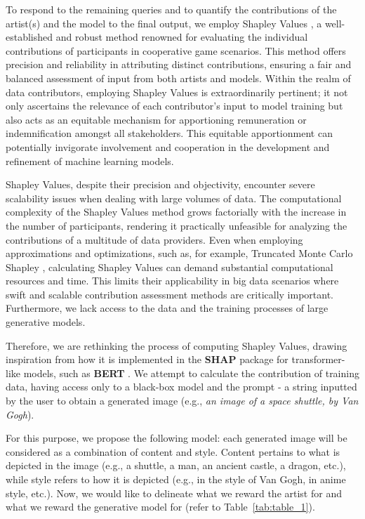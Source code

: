 \documentclass[12pt, letterpaper]{article}
\begin{document}
To respond to the remaining queries and to quantify the contributions of the artist(s) and the model to the final output, we employ Shapley Values \cite{shapley1953value}, a well-established and robust method renowned for evaluating the individual contributions of participants in cooperative game scenarios. This method offers precision and reliability in attributing distinct contributions, ensuring a fair and balanced assessment of input from both artists and models. Within the realm of data contributors, employing Shapley Values is extraordinarily pertinent; it not only ascertains the relevance of each contributor’s input to model training but also acts as an equitable mechanism for apportioning remuneration or indemnification amongst all stakeholders. This equitable apportionment can potentially invigorate involvement and cooperation in the development and refinement of machine learning models.

Shapley Values, despite their precision and objectivity, encounter severe scalability issues when dealing with large volumes of data. The computational complexity of the Shapley Values method grows factorially with the increase in the number of participants, rendering it practically unfeasible for analyzing the contributions of a multitude of data providers. Even when employing approximations and optimizations, such as, for example, Truncated Monte Carlo Shapley \cite{ghorbani2019data}, calculating Shapley Values can demand substantial computational resources and time. This limits their applicability in big data scenarios where swift and scalable contribution assessment methods are critically important. Furthermore, we lack access to the data and the training processes of large generative models.

Therefore, we are rethinking the process of computing Shapley Values, drawing inspiration from how it is implemented in the \textbf{SHAP} \cite{lundberg2017unified} package for transformer-like models, such as \textbf{BERT} \cite{kokalj-etal-2021-bert} . We attempt to calculate the contribution of training data, having access only to a black-box model and the prompt - a string inputted by the user to obtain a generated image (e.g., \textit{an image of a space shuttle, by Van Gogh}).

For this purpose, we propose the following model: each generated image will be considered as a combination of content and style. Content pertains to what is depicted in the image (e.g., a shuttle, a man, an ancient castle, a dragon, etc.), while style refers to how it is depicted (e.g., in the style of Van Gogh, in anime style, etc.). Now, we would like to delineate what we reward the artist for and what we reward the generative model for (refer to Table~\ref{tab:table_1}).
\end{document}
